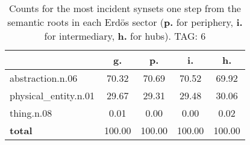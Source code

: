 \begin{table}[h!]
\begin{center}
\begin{tabular}{| l | c | c | c | c |}\hline
 & g. & p. & i. & h. \\\hline
abstraction.n.06 & 70.32  & 70.69  & 70.52  & 69.92 \\\hline
physical\_entity.n.01 & 29.67  & 29.31  & 29.48  & 30.06 \\\hline
thing.n.08 & 0.01  & 0.00  & 0.00  & 0.02 \\\hline
{{\bf total}} & 100.00  & 100.00  & 100.00  & 100.00 \\\hline
\end{tabular}
\caption{Counts for the most incident synsets one step from the semantic roots in each Erd\"os sector ({\bf p.} for periphery, {\bf i.} for intermediary, {\bf h.} for hubs). TAG: 6}
\end{center}
\end{table}